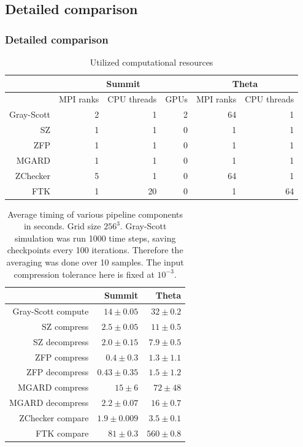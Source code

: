 \subsection{Detailed comparison}
\begin{frame}[fragile]
  \frametitle{Detailed comparison}

{\tiny
\begin{table}[H]
\centering
\begin{tabular}{|r|r|r|r|r|r|}
\hline
 & \multicolumn{3}{|c|}{Summit} & \multicolumn{2}{|c|}{Theta} \\
 \hline	
	 & MPI ranks & CPU threads & GPUs & MPI ranks & CPU threads\\
\hline
	Gray-Scott & 2 & 1 & 2 & 64 & 1\\
\hline
	SZ & 1 & 1 & 0 & 1 & 1\\
\hline
	ZFP & 1 & 1 & 0 & 1 & 1\\
\hline
	MGARD & 1 & 1 & 0 & 1 & 1\\
\hline
	ZChecker & 5 & 1 & 0 & 64 & 1\\
\hline
	FTK & 1 & 20 & 0 & 1 & 64\\
\hline
\end{tabular}
\caption{Utilized computational resources}
\label{cresources}
\end{table}
}

{\tiny

\begin{table}[H]
\centering
\begin{tabular}{|r|r|r|}
\hline
	 & Summit & Theta\\
\hline
	Gray-Scott compute & $14 \pm 0.05$ & $32 \pm 0.2$ \\
\hline
	SZ compress & $2.5 \pm 0.05$ & $11 \pm 0.5$ \\
\hline
	SZ decompress  & $2.0 \pm 0.15$ & $ 7.9 \pm 0.5$ \\
\hline
	ZFP compress & $0.4 \pm 0.3 $ & $1.3 \pm 1.1$ \\
\hline
	ZFP decompress & $0.43 \pm 0.35$ & $1.5 \pm 1.2$ \\
\hline
	MGARD compress & $15 \pm 6$ & $72 \pm 48$\\
\hline
	MGARD decompress & $2.2 \pm 0.07$ & $16 \pm 0.7$\\
\hline
	ZChecker compare & $1.9 \pm 0.009$ & $3.5 \pm 0.1$ \\
\hline
	FTK compare & $81 \pm 0.3$ & $560 \pm 0.8$ \\
\hline
\end{tabular}
\caption{Average timing of various pipeline components in seconds.
  Grid size $256^3$. Gray-Scott simulation was run 1000 time steps, saving checkpoints every 100 iterations.
Therefore the averaging was done over 10 samples. The input compression tolerance here is fixed at $10^{-3}$. }
\label{timing}
\end{table}

}

  
\end{frame}


